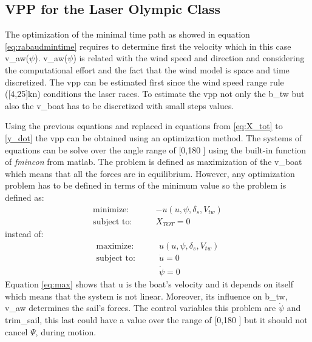 \subsection{ VPP for the Laser Olympic Class}
The optimization of the minimal time path as showed in equation \ref{eq:rabaudmintime} requires to determine first the velocity which in this case \acrshort{v_aw}($\psi$). \acrshort{v_aw}($\psi$) is related with the wind speed and direction and considering the computational effort and the fact that the wind model is space and time discretized. The \acrshort{vpp} can be estimated first since the wind speed range rule ([4,25]kn) conditions the laser races. To estimate the \acrshort{vpp} not only the \acrshort{b_tw} but also the \acrshort{v_boat} has to be discretized with small steps values. \par \noindent 
Using the previous equations and replaced in equations from \ref{eq:X_tot} to \ref{y_dot} the \acrshort{vpp} can be obtained using an optimization method. The systems of equations can be solve over the angle range of [0,180 \degree] using the built-in function of \textit{fmincon} from \acrshort{matlab}\cite{rein2012tra}. The problem is defined as maximization of the \acrshort{v_boat} which means that all the forces are in equilibrium. However, any  optimization problem has to be defined in terms of the minimum value so the problem is defined as:
\begin{align}
    \text{minimize:}\qquad & -u(u,\psi,\delta_{s},V_{tw})  \label{eq:max}\\
\text{subject to:} \qquad & X_{TOT}=0
\end{align} \label{eq:opt_vpp2}
instead of: 
\begin{align}
    \text{maximize:}\qquad & u(u,\psi,\delta_{s},V_{tw})  \label{eq:max2}\\
\text{subject to:} \qquad & \Dot{u}=0 \\
& \Dot{\psi}=0
\end{align} \label{eq:opt_vpp}
Equation \ref{eq:max} shows that \acrshort{u} is the boat's velocity and it depends on itself which means that the system is not linear. Moreover, its influence on \acrshort{b_tw}, \acrshort{v_aw} determines the sail's forces. The control variables this problem are $\Dot{\psi}$ and \acrshort{trim_sail}, this last could have a value over the range of [0,180 \degree] but it should not cancel $\Psi$, during motion.
\par
